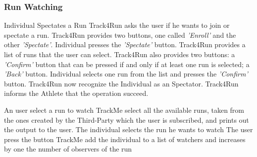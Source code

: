 \documentclass[a4paper]{article}
\begin{document}
        \subsubsection{Run Watching}
        
        \begin{usecase}{Individual Spectates a Run}
              {Track4Run asks the user if he wants to join or spectate a run. Track4Run provides two buttons, one called \textit{'Enroll'} and the other \textit{'Spectate'}.}
              {Individual presses the \textit{'Spectate'} button.}
              {Track4Run provides a list of runs that the user can select. Track4Run also provides two buttons: a \textit{'Confirm'} button that can be pressed if and only if at least one run is selected; a \textit{'Back'} button.}
              {Individual selects one run from the list and presses the \textit{'Confirm'} button.}
              {Track4Run now recognize the Individual as an Spectator.}
              {Track4Run informs the Athlete that the operation succeed.}
        \end{usecase}
        
        \begin{usecase}{An user select a run to watch}
              {TrackMe select all the available runs, taken from the ones created by the Third-Party which the user is subscribed, and prints out the output to the user.}
              {The individual selects the run he wants to watch}
              {The user press the  button }
              {TrackMe add the individual to a list of watchers and increases by one the number of observers of the run}
           
        \end{usecase}    
        
\end{document}
